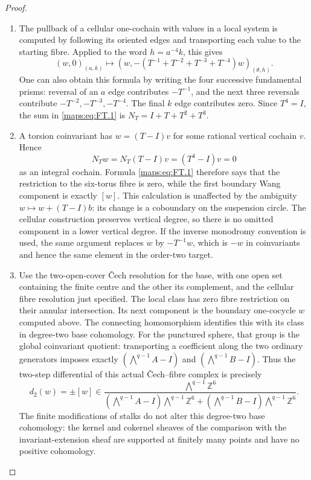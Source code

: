 \documentclass[11pt,a4paper]{article}
\theoremstyle{definition}
\begin{document}
\begin{proof}
\begin{enumerate}[label=\arabic*.]
\item The pullback of a cellular one-cochain with values in a local
system is computed by following its oriented edges and transporting
each value to the starting fibre. Applied to the word
$h=a^{-4}k$, this gives
\[
 (w,0)_{(a,k)}\longmapsto
 \left(w,-(T^{-1}+T^{-2}+T^{-3}+T^{-4})w\right)_{(\theta,h)}.
\tag{FT.1}\label{maps:eq:FT.1}
\]
One can also obtain this formula by writing the four successive
fundamental prisms: reversal of an $a$ edge contributes $-T^{-1}$,
and the next three reversals contribute $-T^{-2},-T^{-3},-T^{-4}$.
The final $k$ edge contributes zero. Since $T^4=I$, the sum in
\textup{\eqref{maps:eq:FT.1}} is $N_T=I+T+T^2+T^3$.

\item A torsion coinvariant has $w=(T-I)v$ for some rational vertical
cochain $v$. Hence
\[
 N_Tw=N_T(T-I)v=(T^4-I)v=0
\]
as an integral cochain. Formula \textup{\eqref{maps:eq:FT.1}} therefore says
that the restriction to the six-torus fibre is zero, while the
first boundary Wang component is exactly $[w]$. This calculation
is unaffected by the ambiguity $w\mapsto w+(T-I)b$: its change is
a coboundary on the suspension circle. The cellular construction
preserves vertical degree, so there is no omitted component in a
lower vertical degree. If the inverse monodromy convention is used,
the same argument replaces $w$ by $-T^{-1}w$, which is $-w$ in
coinvariants and hence the same element in the order-two target.

\item Use the two-open-cover \v{C}ech resolution for the base, with one
open set containing the finite centre and the other its complement,
and the cellular fibre resolution just specified. The local class
has zero fibre restriction on their annular intersection. Its next
component is the boundary one-cocycle $w$ computed above. The
connecting homomorphism identifies this with its class in degree-two
base cohomology. For the punctured sphere, that group is the global
coinvariant quotient: transporting a coefficient along the two
ordinary generators imposes exactly $(\bigwedge^{q-1}A-I)$ and
$(\bigwedge^{q-1}B-I)$. Thus the two-step differential of this
actual \v{C}ech--fibre complex is precisely
\[
 d_2(w)=\pm[w]\in
 \frac{\bigwedge^{q-1}\mathbb Z^6}
 {(\bigwedge^{q-1}A-I)\bigwedge^{q-1}\mathbb Z^6+
  (\bigwedge^{q-1}B-I)\bigwedge^{q-1}\mathbb Z^6}.
\]
The finite modifications of stalks do not alter this degree-two
base cohomology: the kernel and cokernel sheaves of the comparison
with the invariant-extension sheaf are supported at finitely many
points and have no positive cohomology.


\end{enumerate}
\end{proof}
\end{document}
